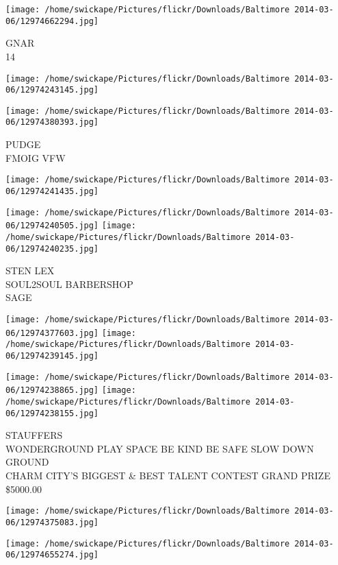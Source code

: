 \documentclass[10pt,letterpaper]{article}
\begin{document}
\vspace{0.25in}
\texttt{[image: /home/swickape/Pictures/flickr/Downloads/Baltimore 2014-03-06/12974662294.jpg]}

GNAR\\
14
\pagebreak

\texttt{[image: /home/swickape/Pictures/flickr/Downloads/Baltimore 2014-03-06/12974243145.jpg]}

\vspace{0.25in}
\texttt{[image: /home/swickape/Pictures/flickr/Downloads/Baltimore 2014-03-06/12974380393.jpg]}

PUDGE\\
FMOIG VFW
\pagebreak

\texttt{[image: /home/swickape/Pictures/flickr/Downloads/Baltimore 2014-03-06/12974241435.jpg]}

\vspace{0.25in}
\texttt{[image: /home/swickape/Pictures/flickr/Downloads/Baltimore 2014-03-06/12974240505.jpg]}
\texttt{[image: /home/swickape/Pictures/flickr/Downloads/Baltimore 2014-03-06/12974240235.jpg]}

STEN LEX\\
SOUL2SOUL BARBERSHOP\\
SAGE
\pagebreak

\texttt{[image: /home/swickape/Pictures/flickr/Downloads/Baltimore 2014-03-06/12974377603.jpg]}
\texttt{[image: /home/swickape/Pictures/flickr/Downloads/Baltimore 2014-03-06/12974239145.jpg]}

\texttt{[image: /home/swickape/Pictures/flickr/Downloads/Baltimore 2014-03-06/12974238865.jpg]}
\texttt{[image: /home/swickape/Pictures/flickr/Downloads/Baltimore 2014-03-06/12974238155.jpg]}

STAUFFERS\\
WONDERGROUND PLAY SPACE BE KIND BE SAFE SLOW DOWN\\
GROUND\\
CHARM CITY'S BIGGEST \& BEST TALENT CONTEST GRAND PRIZE \$5000.00
\pagebreak

\texttt{[image: /home/swickape/Pictures/flickr/Downloads/Baltimore 2014-03-06/12974375083.jpg]}

\vspace{0.25in}
\texttt{[image: /home/swickape/Pictures/flickr/Downloads/Baltimore 2014-03-06/12974655274.jpg]}
\end{document}
